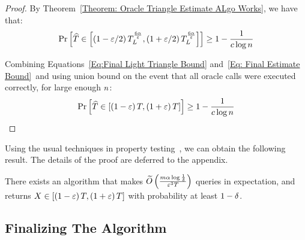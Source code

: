 \begin{proof}
    By Theorem~\ref{Theorem: Oracle Triangle Estimate ALgo Works}, we have that:
    \begin{align}
        \Pr\left[{\widehat{T} \in \left[{\left({1-\varepsilon/2}\right)T^{\frac{6\alpha}{\varepsilon}}_{L},\left({1+\varepsilon/2}\right)T^{\frac{6\alpha}{\varepsilon}}_{L}}\right]}\right] \geq 1 - \frac{1}{c\log n}\label{Eq: Final Estimate Bound}
    \end{align}

    Combining Equations~\ref{Eq:Final Light Triangle Bound} and~\ref{Eq: Final Estimate Bound}~and using union bound on the event that all oracle calls were executed correctly, for large enough $n$:
    \begin{align*}
        \Pr\left[{\widehat{T} \in \left[{\left({1-\varepsilon}\right)T,\left({1+\varepsilon}\right)T}\right]}\right] \geq 1 - \frac{1}{c\log n}
    \end{align*}
\end{proof}

Using the usual techniques in property testing~\citep{Dana_Ron_Triangle_Counting,DBLP:conf/soda/EdenRS20,chakrabarti2015data,Goldreich_Ron_EdgeCounting}, we can obtain the following result. The details of the proof are deferred to the appendix.

\begin{theorem}\label{Theorem: Final Upper Bound}
    There exists an algorithm that makes $\widetilde{O}\left({{\frac{m\alpha\log\frac{1}{\delta}}{\varepsilon^3T}}}\right)$ queries in expectation, and returns $X \in \left[{\left({1-\varepsilon}\right)T,\left({1+\varepsilon}\right)T}\right]$ with probability at least $1 - \delta$.
\end{theorem}


\subsection{Finalizing The Algorithm}

